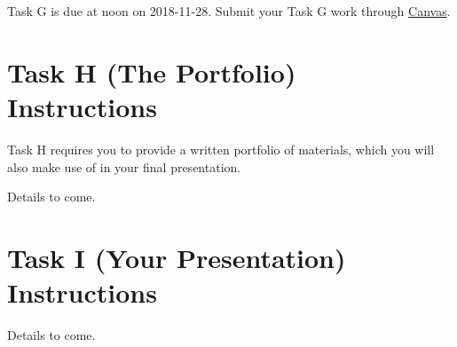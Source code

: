 \documentclass[]{book}
\theoremstyle{definition}
\theoremstyle{definition}
\theoremstyle{definition}
\theoremstyle{remark}
\begin{document}
Task G is due at noon on 2018-11-28. Submit your Task G work through
\href{https://canvas.case.edu/}{Canvas}.

\hypertarget{taskH}{%
\chapter{Task H (The Portfolio) Instructions}\label{taskH}}

Task H requires you to provide a written portfolio of materials, which
you will also make use of in your final presentation.

Details to come.

\hypertarget{taskI}{%
\chapter{Task I (Your Presentation) Instructions}\label{taskI}}

Details to come.


\end{document}
